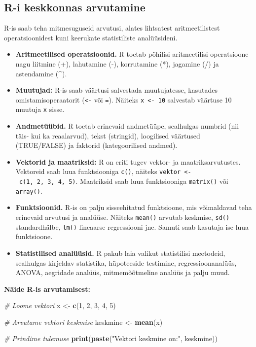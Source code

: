 \documentclass[
]{book}
\newenvironment{Shaded}{\begin{snugshade}}{\end{snugshade}}
\newcommand{\CommentTok}[1]{\textcolor[rgb]{0.56,0.35,0.01}{\textit{#1}}}
\newcommand{\DecValTok}[1]{\textcolor[rgb]{0.00,0.00,0.81}{#1}}
\newcommand{\FunctionTok}[1]{\textcolor[rgb]{0.13,0.29,0.53}{\textbf{#1}}}
\newcommand{\NormalTok}[1]{#1}
\newcommand{\OtherTok}[1]{\textcolor[rgb]{0.56,0.35,0.01}{#1}}
\newcommand{\StringTok}[1]{\textcolor[rgb]{0.31,0.60,0.02}{#1}}
\providecommand{\tightlist}{%
  \setlength{\itemsep}{0pt}\setlength{\parskip}{0pt}}
\renewenvironment{Shaded} {\begin{snugshade}\footnotesize} {\end{snugshade}}
\begin{document}
\subsection{R-i keskkonnas arvutamine}\label{r-i-keskkonnas-arvutamine}

R-is saab teha mitmesuguseid arvutusi, alates lihtsatest aritmeetilistest operatsioonidest kuni keerukate statistiliste analüüsideni.

\begin{itemize}
\tightlist
\item
  \textbf{Aritmeetilised operatsioonid.} R toetab põhilisi aritmeetilisi operatsioone nagu liitmine (+), lahutamine (-), korrutamine (*), jagamine (/) ja astendamine (\^{}).
\item
  \textbf{Muutujad:} R-is saab väärtusi salvestada muutujatesse, kasutades omistamisoperaatorit (\texttt{\textless{}-} või \texttt{=}). Näiteks \texttt{x\ \textless{}-\ 10} salvestab väärtuse 10 muutuja \texttt{x} sisse.
\item
  \textbf{Andmetüübid.} R toetab erinevaid andmetüüpe, sealhulgas numbrid (nii täis- kui ka reaalarvud), tekst (stringid), loogilised väärtused (TRUE/FALSE) ja faktorid (kategoorilised andmed).
\item
  \textbf{Vektorid ja maatriksid:} R on eriti tugev vektor- ja maatriksarvutustes. Vektoreid saab luua funktsiooniga \texttt{c()}, näiteks \texttt{vektor\ \textless{}-\ c(1,\ 2,\ 3,\ 4,\ 5)}. Maatriksid saab luua funktsiooniga \texttt{matrix()} või \texttt{array()}.
\item
  \textbf{Funktsioonid.} R-is on palju sisseehitatud funktsioone, mis võimaldavad teha erinevaid arvutusi ja analüüse. Näiteks \texttt{mean()} arvutab keskmise, \texttt{sd()} standardhälbe, \texttt{lm()} lineaarse regressiooni jne. Samuti saab kasutaja ise luua funktsioone.
\item
  \textbf{Statistilised analüüsid.} R pakub laia valikut statistilisi meetodeid, sealhulgas kirjeldav statistika, hüpoteeside testimine, regressioonanalüüs, ANOVA, aegridade analüüs, mitmemõõtmeline analüüs ja palju muud.
\end{itemize}

\textbf{Näide R-is arvutamisest:}

\begin{Shaded}
\begin{Highlighting}[]
\CommentTok{\# Loome vektori}
\NormalTok{x }\OtherTok{\textless{}{-}} \FunctionTok{c}\NormalTok{(}\DecValTok{1}\NormalTok{, }\DecValTok{2}\NormalTok{, }\DecValTok{3}\NormalTok{, }\DecValTok{4}\NormalTok{, }\DecValTok{5}\NormalTok{)}

\CommentTok{\# Arvutame vektori keskmise}
\NormalTok{keskmine }\OtherTok{\textless{}{-}} \FunctionTok{mean}\NormalTok{(x)}

\CommentTok{\# Prindime tulemuse}
\FunctionTok{print}\NormalTok{(}\FunctionTok{paste}\NormalTok{(}\StringTok{"Vektori keskmine on:"}\NormalTok{, keskmine))}
\end{Highlighting}
\end{Shaded}
\end{document}
